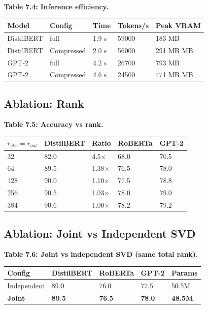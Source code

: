 \textbf{Table 7.4: Inference efficiency.}

\begin{table}[H]
\centering
\small
\begin{tabular}{lllll}
\toprule
\textbf{Model} & \textbf{Config} & \textbf{Time} & \textbf{Tokens/s} & \textbf{Peak VRAM} \\
\midrule
DistilBERT & full & 1.9 s & 59000 & 183 MB \\
DistilBERT & Compressed & 2.0 s & 56000 & 291 MB MB \\
GPT-2 & full & 4.2 s & 26700 & 793 MB \\
GPT-2 & Compressed & 4.6 s & 24500 & 471 MB MB \\
\bottomrule
\end{tabular}
\end{table}

\subsection{Ablation: Rank}

\textbf{Table 7.5: Accuracy vs rank.}

\begin{table}[H]
\centering
\small
\begin{tabular}{lllll}
\toprule
\textbf{$r_{qkv} = r_{out}$} & \textbf{DistilBERT} & \textbf{Ratio} & \textbf{RoBERTa} & \textbf{GPT-2} \\
\midrule
32 & 82.0 & 4.5$\times$ & 68.0 & 70.5 \\
64 & 89.5 & 1.38$\times$ & 76.5 & 78.0 \\
128 & 90.0 & 1.10$\times$ & 77.5 & 78.8 \\
256 & 90.5 & 1.03$\times$ & 78.0 & 79.0 \\
384 & 90.6 & 1.00$\times$ & 78.2 & 79.2 \\
\bottomrule
\end{tabular}
\end{table}

\subsection{Ablation: Joint vs Independent SVD}

\textbf{Table 7.6: Joint vs independent SVD (same total rank).}

\begin{table}[H]
\centering
\small
\begin{tabular}{lllll}
\toprule
\textbf{Config} & \textbf{DistilBERT} & \textbf{RoBERTa} & \textbf{GPT-2} & \textbf{Params} \\
\midrule
Independent & 89.0 & 76.0 & 77.5 & 50.5M \\
\textbf{Joint} & \textbf{89.5} & \textbf{76.5} & \textbf{78.0} & \textbf{48.5M} \\
\bottomrule
\end{tabular}
\end{table}

